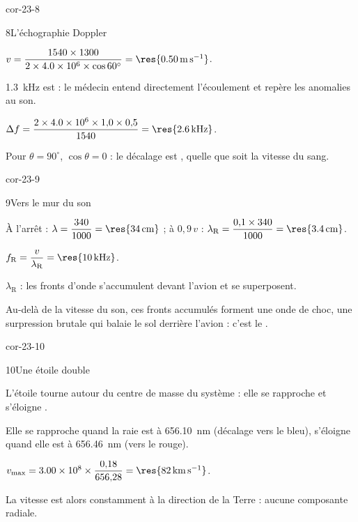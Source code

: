 \begin{blocLivre}{cor-23-8}
\begin{corrige}{8}{L'échographie Doppler}
\begin{questions}
\item $v=\dfrac{1540\times1300}{2\times\num{4.0e6}\times\cos60^\circ}=\res{\qty{0,50}{m.s^{-1}}}$.
\item \qty{1,3}{kHz} est  : le médecin entend directement l'écoulement et repère les anomalies au son.
\item $\Delta f=\dfrac{2\times\num{4.0e6}\times1{,}0\times0{,}5}{1540}=\res{\qty{2,6}{kHz}}$.
\item Pour $\theta=90^\circ$, $\cos\theta=0$ : le décalage est , quelle que soit la vitesse du sang.
\end{questions}
\end{corrige}
\end{blocLivre}
\begin{blocLivre}{cor-23-9}
\begin{corrige}{9}{Vers le mur du son}
\begin{questions}
\item À l'arrêt : $\lambda=\dfrac{340}{1000}=\res{\qty{34}{cm}}$ ; à $0{,}9\,v$ : $\lambda_\mathrm{R}=\dfrac{0{,}1\times340}{1000}=\res{\qty{3,4}{cm}}$.
\item $f_\mathrm{R}=\dfrac{v}{\lambda_\mathrm{R}}=\res{\qty{10}{kHz}}$.
\item $\lambda_\mathrm{R}$  : les fronts d'onde s'accumulent devant l'avion et se superposent.
\item Au-delà de la vitesse du son, ces fronts accumulés forment une onde de choc, une surpression brutale qui balaie le
sol derrière l'avion : c'est le .
\end{questions}
\end{corrige}
\end{blocLivre}
\begin{blocLivre}{cor-23-10}
\begin{corrige}{10}{Une étoile double}
\begin{questions}
\item L'étoile tourne autour du centre de masse du système : elle se rapproche et s'éloigne .
\item Elle se rapproche quand la raie est à \qty{656,10}{nm} (décalage vers le bleu), s'éloigne quand elle est à
\qty{656,46}{nm} (vers le rouge).
\item $v_\mathrm{max}=\num{3.00e8}\times\dfrac{0{,}18}{656{,}28}=\res{\qty{82}{km.s^{-1}}}$.
\item La vitesse est alors constamment  à la direction de la Terre : aucune composante radiale.
\end{questions}
\end{corrige}
\end{blocLivre}
